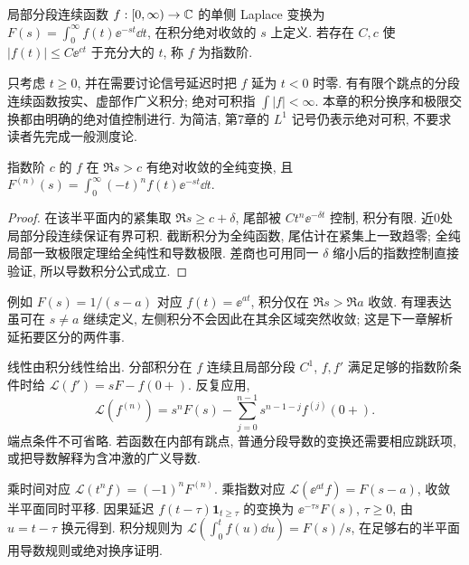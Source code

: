 \begin{definition}
局部分段连续函数 $f:[0,\infty)\to\mathbb C$ 的单侧 Laplace 变换为 $F(s)=\int_0^\infty f(t)\ee^{-st}\dd t$, 在积分绝对收敛的 $s$ 上定义. 若存在 $C,c$ 使 $|f(t)|\le C\ee^{ct}$ 于充分大的 $t$, 称 $f$ 为指数阶.
\end{definition}
只考虑 $t\ge0$, 并在需要讨论信号延迟时把 $f$ 延为 $t<0$ 时零. 有有限个跳点的分段连续函数按实、虚部作广义积分; 绝对可积指 $\int|f|<\infty$. 本章的积分换序和极限交换都由明确的绝对值控制进行. 为简洁, 第7章的 $L^1$ 记号仍表示绝对可积, 不要求读者先完成一般测度论.
\begin{theorem}
指数阶 $c$ 的 $f$ 在 $\Re s>c$ 有绝对收敛的全纯变换, 且 $F^{(n)}(s)=\int_0^\infty(-t)^nf(t)\ee^{-st}\dd t$.
\end{theorem}
\begin{proof}
在该半平面内的紧集取 $\Re s\ge c+\delta$, 尾部被 $Ct^n\ee^{-\delta t}$ 控制, 积分有限. 近0处局部分段连续保证有界可积. 截断积分为全纯函数, 尾估计在紧集上一致趋零; 全纯局部一致极限定理给全纯性和导数极限. 差商也可用同一 $\delta$ 缩小后的指数控制直接验证, 所以导数积分公式成立.
\end{proof}
例如 $F(s)=1/(s-a)$ 对应 $f(t)=\ee^{at}$, 积分仅在 $\Re s>\Re a$ 收敛. 有理表达虽可在 $s\ne a$ 继续定义, 左侧积分不会因此在其余区域突然收敛; 这是下一章解析延拓要区分的两件事.

线性由积分线性给出. 分部积分在 $f$ 连续且局部分段 $C^1$, $f,f'$ 满足足够的指数阶条件时给 $\mathcal L(f')=sF-f(0+)$. 反复应用,
\[
\mathcal L(f^{(n)})=s^nF(s)-\sum_{j=0}^{n-1}s^{n-1-j}f^{(j)}(0+).
\]
端点条件不可省略. 若函数在内部有跳点, 普通分段导数的变换还需要相应跳跃项, 或把导数解释为含冲激的广义导数.

乘时间对应 $\mathcal L(t^nf)=(-1)^nF^{(n)}$. 乘指数对应 $\mathcal L(\ee^{at}f)=F(s-a)$, 收敛半平面同时平移. 因果延迟 $f(t-\tau)\mathbf1_{t\ge\tau}$ 的变换为 $\ee^{-\tau s}F(s)$, $\tau\ge0$, 由 $u=t-\tau$ 换元得到. 积分规则为 $\mathcal L(\int_0^tf(u)\dd u)=F(s)/s$, 在足够右的半平面用导数规则或绝对换序证明.

